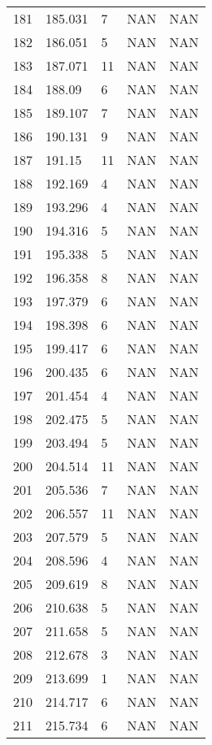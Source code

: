 \documentclass{article}
\begin{document}
\begin{longtable}{@{}lllll@{}}
				181 & 185.031 & 7     & NAN   & NAN   \\
				182 & 186.051 & 5     & NAN   & NAN   \\
				183 & 187.071 & 11    & NAN   & NAN   \\
				184 & 188.09  & 6     & NAN   & NAN   \\
				185 & 189.107 & 7     & NAN   & NAN   \\
				186 & 190.131 & 9     & NAN   & NAN   \\
				187 & 191.15  & 11    & NAN   & NAN   \\
				188 & 192.169 & 4     & NAN   & NAN   \\
				189 & 193.296 & 4     & NAN   & NAN   \\
				190 & 194.316 & 5     & NAN   & NAN   \\
				191 & 195.338 & 5     & NAN   & NAN   \\
				192 & 196.358 & 8     & NAN   & NAN   \\
				193 & 197.379 & 6     & NAN   & NAN   \\
				194 & 198.398 & 6     & NAN   & NAN   \\
				195 & 199.417 & 6     & NAN   & NAN   \\
				196 & 200.435 & 6     & NAN   & NAN   \\
				197 & 201.454 & 4     & NAN   & NAN   \\
				198 & 202.475 & 5     & NAN   & NAN   \\
				199 & 203.494 & 5     & NAN   & NAN   \\
				200 & 204.514 & 11    & NAN   & NAN   \\
				201 & 205.536 & 7     & NAN   & NAN   \\
				202 & 206.557 & 11    & NAN   & NAN   \\
				203 & 207.579 & 5     & NAN   & NAN   \\
				204 & 208.596 & 4     & NAN   & NAN   \\
				205 & 209.619 & 8     & NAN   & NAN   \\
				206 & 210.638 & 5     & NAN   & NAN   \\
				207 & 211.658 & 5     & NAN   & NAN   \\
				208 & 212.678 & 3     & NAN   & NAN   \\
				209 & 213.699 & 1     & NAN   & NAN   \\
				210 & 214.717 & 6     & NAN   & NAN   \\
				211 & 215.734 & 6     & NAN   & NAN   \\

\end{longtable}
\end{document}

